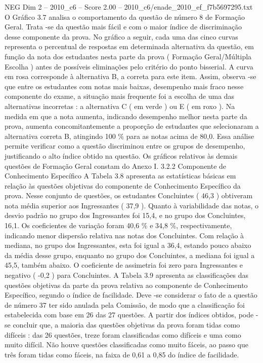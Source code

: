 \begin{textsample}{NEG Dim 2 – 2010\_c6 – Score 2.00 – 2010\_c6/enade\_2010\_ef\_f7b5697295.txt}
O Gráfico 3.7 analisa o comportamento da questão de número 8 de Formação Geral.
Trata -se da questão mais fácil e com o maior índice de discriminação desse componente da prova.
No gráfico a seguir, cada uma das cinco curvas representa o percentual de respostas em determinada alternativa da questão, em função da nota dos estudantes nesta parte da prova ( Formação Geral/Múltipla Escolha ) antes de possíveis eliminações pelo critério do ponto bisserial.
A curva em rosa corresponde à alternativa B, a correta para este item.
Assim, observa -se que entre os estudantes com notas mais baixas, desempenho mais fraco nesse componente do exame, a situação mais frequente foi a escolha de uma das alternativas incorretas : a alternativa C ( em verde ) ou E ( em roxo ).
Na medida em que a nota aumenta, indicando desempenho melhor nesta parte da prova, aumenta concomitantemente a proporção de estudantes que selecionaram a alternativa correta B, atingindo 100 \% para as notas acima de 80,0.
Essa análise permite verificar como a questão discriminou entre os grupos de desempenho, justificando o alto índice obtido na questão.
Os gráficos relativos às demais questões de Formação Geral constam do Anexo I. 3.2.2 Componente de Conhecimento Específico A Tabela 3.8 apresenta as estatísticas básicas em relação às questões objetivas do componente de Conhecimento Específico da prova.
Nesse conjunto de questões, os estudantes Concluintes ( 46,3 ) obtiveram nota média superior aos Ingressantes ( 37,9 ).
Quanto à variabilidade das notas, o desvio padrão no grupo dos Ingressantes foi 15,4, e no grupo dos Concluintes, 16,1.
Os coeficientes de variação foram 40,6 \% e 34,8 \%, respectivamente, indicando menor dispersão relativa nas notas dos Concluintes.
Com relação à mediana, no grupo dos Ingressantes, esta foi igual a 36,4, estando pouco abaixo da média desse grupo, enquanto no grupo dos Concluintes, a mediana foi igual a 45,5, também abaixo.
O coeficiente de assimetria foi zero para Ingressantes e negativo ( -0,2 ) para Concluintes.
A Tabela 3.9 apresenta as classificações das questões objetivas da parte da prova relativa ao componente de Conhecimento Específico, segundo o índice de facilidade.
Deve -se considerar o fato de a questão de número 37 ter sido anulada pela Comissão, de modo que a classificação foi estabelecida com base em 26 das 27 questões.
A partir dos índices obtidos, pode -se concluir que, a maioria das questões objetivas da prova foram tidas como difíceis : das 26 questões, treze foram classificadas como difíceis e uma como muito difícil.
Não houve questões classificadas como muito fáceis, ao passo que três foram tidas como fáceis, na faixa de 0,61 a 0,85 do índice de facilidade.

\end{textsample}
